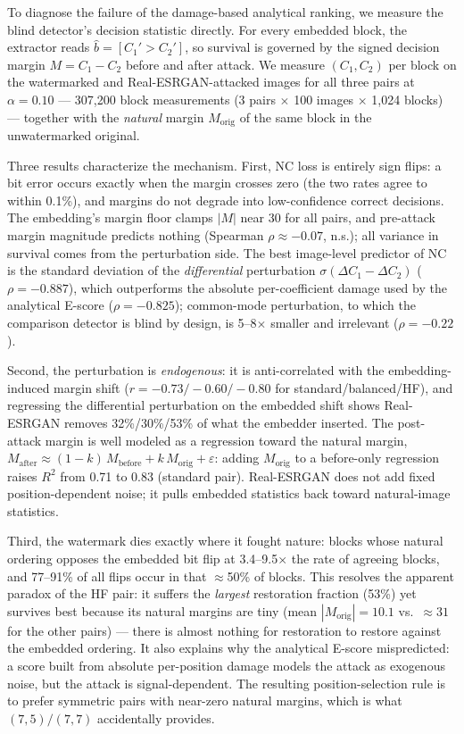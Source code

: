 \documentclass[conference]{IEEEtran}
\begin{document}
To diagnose the failure of the damage-based analytical ranking, we
measure the blind detector's decision statistic directly. For every
embedded block, the extractor reads $\hat{b} = [C_1' > C_2']$, so
survival is governed by the signed decision margin $M = C_1 - C_2$
before and after attack. We measure $(C_1, C_2)$ per block on the
watermarked and Real-ESRGAN-attacked images for all three pairs at
$\alpha = 0.10$ --- 307,200 block measurements (3 pairs $\times$ 100
images $\times$ 1,024 blocks) --- together with the \emph{natural}
margin $M_{\mathrm{orig}}$ of the same block in the unwatermarked
original.

Three results characterize the mechanism. First, NC loss is entirely
sign flips: a bit error occurs exactly when the margin crosses zero
(the two rates agree to within 0.1\%), and margins do not degrade into
low-confidence correct decisions. The embedding's margin floor clamps
$|M|$ near 30 for all pairs, and pre-attack margin magnitude predicts
nothing (Spearman $\rho \approx -0.07$, n.s.); all variance in survival
comes from the perturbation side. The best image-level predictor of NC
is the standard deviation of the \emph{differential} perturbation
$\sigma(\Delta C_1 - \Delta C_2)$ ($\rho = -0.887$), which outperforms
the absolute per-coefficient damage used by the analytical E-score
($\rho = -0.825$); common-mode perturbation, to which the comparison
detector is blind by design, is 5--8$\times$ smaller and irrelevant
($\rho = -0.22$).

Second, the perturbation is \emph{endogenous}: it is anti-correlated
with the embedding-induced margin shift ($r = -0.73 / -0.60 / -0.80$
for standard/balanced/HF), and regressing the differential perturbation
on the embedded shift shows Real-ESRGAN removes 32\%/30\%/53\% of what
the embedder inserted. The post-attack margin is well modeled as a
regression toward the natural margin,
$M_{\mathrm{after}} \approx (1-k)\,M_{\mathrm{before}} +
k\,M_{\mathrm{orig}} + \varepsilon$: adding $M_{\mathrm{orig}}$ to a
before-only regression raises $R^2$ from 0.71 to 0.83 (standard pair).
Real-ESRGAN does not add fixed position-dependent noise; it pulls
embedded statistics back toward natural-image statistics.

Third, the watermark dies exactly where it fought nature: blocks whose
natural ordering opposes the embedded bit flip at 3.4--9.5$\times$ the
rate of agreeing blocks, and 77--91\% of all flips occur in that
$\approx$50\% of blocks. This resolves the apparent paradox of the HF
pair: it suffers the \emph{largest} restoration fraction (53\%) yet
survives best because its natural margins are tiny (mean
$|M_{\mathrm{orig}}| = 10.1$ vs.\ $\approx 31$ for the other pairs) ---
there is almost nothing for restoration to restore against the embedded
ordering. It also explains why the analytical E-score mispredicted: a
score built from absolute per-position damage models the attack as
exogenous noise, but the attack is signal-dependent. The resulting
position-selection rule is to prefer symmetric pairs with near-zero
natural margins, which is what $(7,5)/(7,7)$ accidentally provides.
\end{document}
